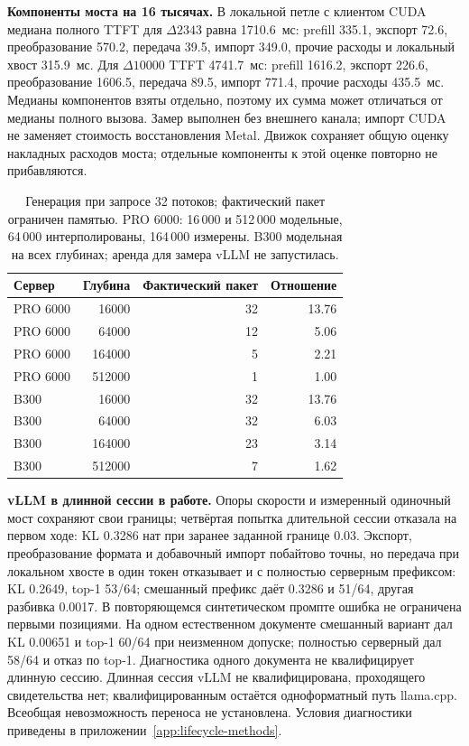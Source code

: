 \textbf{Компоненты моста на 16 тысячах.} В локальной петле с клиентом CUDA медиана полного TTFT
для $\Delta2343$ равна 1710.6~мс: prefill 335.1, экспорт 72.6, преобразование 570.2, передача 39.5,
импорт 349.0, прочие расходы и локальный хвост 315.9~мс.
Для $\Delta10000$ TTFT 4741.7~мс: prefill 1616.2, экспорт 226.6, преобразование 1606.5,
передача 89.5, импорт 771.4, прочие расходы 435.5~мс.
Медианы компонентов взяты отдельно, поэтому их сумма может отличаться от медианы полного вызова.
Замер выполнен без внешнего канала; импорт CUDA не заменяет стоимость восстановления Metal.
Движок сохраняет общую оценку накладных расходов моста; отдельные компоненты к этой оценке повторно не прибавляются.

\begin{table}[t]
\centering
\caption{Генерация при запросе 32 потоков; фактический пакет ограничен памятью.
PRO 6000: 16\,000 и 512\,000 модельные, 64\,000 интерполированы, 164\,000 измерены.
B300 модельная на всех глубинах; аренда для замера vLLM не запустилась.}
\label{tab:r22-decode-model}
\footnotesize
\begin{tabular}{lrrr}
\toprule
Сервер & Глубина & Фактический пакет & Отношение \\
\midrule
PRO 6000 & 16000 & 32 & 13.76 \\
PRO 6000 & 64000 & 12 & 5.06 \\
PRO 6000 & 164000 & 5 & 2.21 \\
PRO 6000 & 512000 & 1 & 1.00 \\
B300 & 16000 & 32 & 13.76 \\
B300 & 64000 & 32 & 6.03 \\
B300 & 164000 & 23 & 3.14 \\
B300 & 512000 & 7 & 1.62 \\
\bottomrule
\end{tabular}
\end{table}

\textbf{vLLM в длинной сессии в работе.} Опоры скорости и измеренный одиночный мост сохраняют свои границы;
четвёртая попытка длительной сессии отказала на первом ходе: KL 0.3286 нат при заранее заданной границе 0.03.
Экспорт, преобразование формата и добавочный импорт побайтово точны, но передача при локальном хвосте в один токен
отказывает и с полностью серверным префиксом: KL 0.2649, top-1 53/64; смешанный префикс даёт 0.3286 и 51/64,
другая разбивка 0.0017. В повторяющемся синтетическом промпте ошибка не ограничена первыми позициями.
На одном естественном документе смешанный вариант дал KL 0.00651 и top-1 60/64 при неизменном допуске;
полностью серверный дал 58/64 и отказ по top-1. Диагностика одного документа не квалифицирует длинную сессию.
Длинная сессия vLLM не квалифицирована, проходящего свидетельства нет; квалифицированным остаётся одноформатный путь llama.cpp.
Всеобщая невозможность переноса не установлена. Условия диагностики приведены в приложении~\ref{app:lifecycle-methods}.

